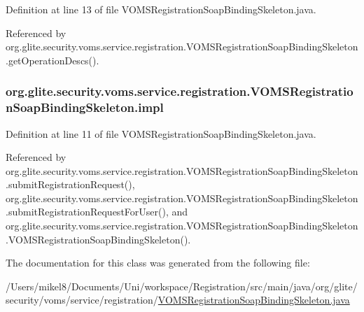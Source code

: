 Definition at line 13 of file VOMSRegistrationSoapBindingSkeleton.java.



Referenced by org.glite.security.voms.service.registration.VOMSRegistrationSoapBindingSkeleton.getOperationDescs().

\hypertarget{classorg_1_1glite_1_1security_1_1voms_1_1service_1_1registration_1_1VOMSRegistrationSoapBindingSkeleton_ade0732e7f9b175d03d807702a62fa79b}{
\subsubsection[{impl}]{ {\bf org.glite.security.voms.service.registration.VOMSRegistrationSoapBindingSkeleton.impl}}}
\label{classorg_1_1glite_1_1security_1_1voms_1_1service_1_1registration_1_1VOMSRegistrationSoapBindingSkeleton_ade0732e7f9b175d03d807702a62fa79b}


Definition at line 11 of file VOMSRegistrationSoapBindingSkeleton.java.



Referenced by org.glite.security.voms.service.registration.VOMSRegistrationSoapBindingSkeleton.submitRegistrationRequest(), org.glite.security.voms.service.registration.VOMSRegistrationSoapBindingSkeleton.submitRegistrationRequestForUser(), and org.glite.security.voms.service.registration.VOMSRegistrationSoapBindingSkeleton.VOMSRegistrationSoapBindingSkeleton().



The documentation for this class was generated from the following file:\begin{DoxyCompactItemize}
\item 
/Users/mikel8/Documents/Uni/workspace/Registration/src/main/java/org/glite/security/voms/service/registration/\hyperlink{VOMSRegistrationSoapBindingSkeleton_8java}{VOMSRegistrationSoapBindingSkeleton.java}\end{DoxyCompactItemize}

